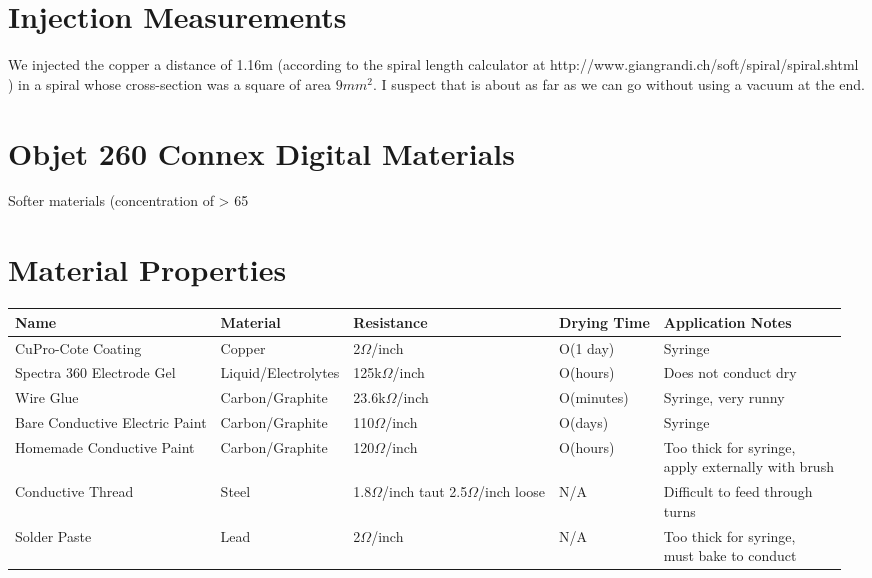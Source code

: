 \newpage
\appendix
\section{Injection Measurements}
We injected the copper a distance of 1.16m (according to the spiral length calculator at http://www.giangrandi.ch/soft/spiral/spiral.shtml ) in a spiral whose cross-section was a square of area $9mm^2$.  I suspect that is about as far as we can go without using a vacuum at the end.

\section{Objet 260 Connex Digital Materials}
Softer materials (concentration of > 65%


\section{Material Properties}

\begin{table*}[t]
\begin{tabular}{ l || l | p{3cm} | l | p{4cm} }
  \hline
  Name & Material & Resistance & Drying Time & Application Notes\\ \hline
  CuPro-Cote Coating & Copper & 2$\Omega$/inch & O(1 day) & Syringe \\ \hline
  Spectra 360 Electrode Gel & Liquid/Electrolytes & 125k$\Omega$/inch & O(hours) & Does not conduct dry \\ \hline
  Wire Glue & Carbon/Graphite &  23.6k$\Omega$/inch & O(minutes) & Syringe, very runny \\ \hline
  Bare Conductive Electric Paint & Carbon/Graphite & 110$\Omega$/inch & O(days) & Syringe \\ \hline
  Homemade Conductive Paint & Carbon/Graphite & 120$\Omega$/inch & O(hours) & \parbox{4cm}{Too thick for syringe,\\ apply externally with brush} \\ \hline
  Conductive Thread & Steel & \parbox{3cm}{1.8$\Omega$/inch taut \\ 2.5$\Omega$/inch loose} & N/A & \parbox{4cm}{Difficult to feed through\\turns} \\ \hline
  Solder Paste & Lead & 2$\Omega$/inch & N/A & \parbox{4cm}{Too thick for syringe,\\ must bake to conduct} \\ \hline
\end{tabular}
\end{table*}